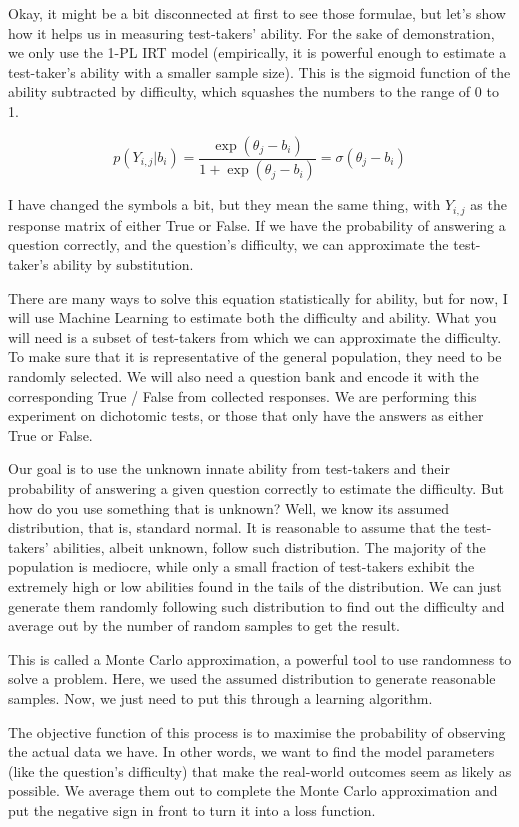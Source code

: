 \documentclass{article}
\begin{document}
Okay, it might be a bit disconnected at first to see those formulae, but let’s show how it helps us in measuring test-takers’ ability. For the sake of demonstration, we only use the 1-PL IRT model (empirically, it is powerful enough to estimate a test-taker’s ability with a smaller sample size). This is the sigmoid function of the ability subtracted by difficulty, which squashes the numbers to the range of 0 to 1.

\[
p\left(Y_{i,j}|b_i\right)=\frac{\exp(\theta_j-b_i)}{1+\exp(\theta_j-b_i)}=\sigma(\theta_j-b_i)
\]

I have changed the symbols a bit, but they mean the same thing, with $Y_{i,j}$ as the response matrix of either True or False. If we have the probability of answering a question correctly, and the question’s difficulty, we can approximate the test-taker’s ability by substitution.

There are many ways to solve this equation statistically for ability, but for now, I will use Machine Learning to estimate both the difficulty and ability. What you will need is a subset of test-takers from which we can approximate the difficulty. To make sure that it is representative of the general population, they need to be randomly selected. We will also need a question bank and encode it with the corresponding True / False from collected responses. We are performing this experiment on dichotomic tests, or those that only have the answers as either True or False.

Our goal is to use the unknown innate ability from test-takers and their probability of answering a given question correctly to estimate the difficulty. But how do you use something that is unknown? Well, we know its assumed distribution, that is, standard normal. It is reasonable to assume that the test-takers' abilities, albeit unknown, follow such distribution. The majority of the population is mediocre, while only a small fraction of test-takers exhibit the extremely high or low abilities found in the tails of the distribution. We can just generate them randomly following such distribution to find out the difficulty and average out by the number of random samples to get the result.

This is called a Monte Carlo approximation, a powerful tool to use randomness to solve a problem. Here, we used the assumed distribution to generate reasonable samples. Now, we just need to put this through a learning algorithm.

The objective function of this process is to maximise the probability of observing the actual data we have. In other words, we want to find the model parameters (like the question's difficulty) that make the real-world outcomes seem as likely as possible. We average them out to complete the Monte Carlo approximation and put the negative sign in front to turn it into a loss function.
\end{document}
